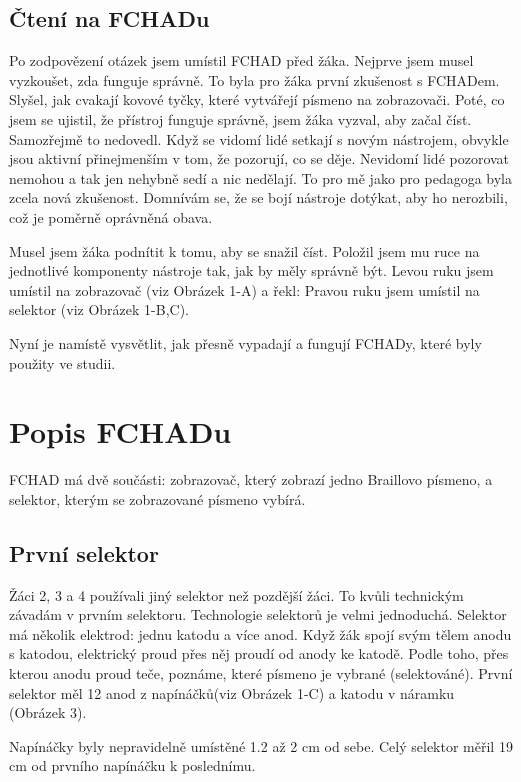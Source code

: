 \subsection{Čtení na FCHADu}

Po zodpovězení otázek jsem umístil FCHAD před žáka.  Nejprve jsem musel vyzkoušet, zda funguje správně. To byla pro žáka první zkušenost s FCHADem.  Slyšel, jak cvakají kovové tyčky, které vytvářejí písmeno na zobrazovači.  Poté, co jsem se ujistil, že přístroj funguje správně, jsem žáka vyzval, aby začal číst.  Samozřejmě to nedovedl.  Když se vidomí lidé setkají s novým nástrojem, obvykle jsou aktivní přinejmenším v tom, že pozorují, co se děje. Nevidomí lidé pozorovat nemohou a tak jen nehybně sedí a nic nedělají. To pro mě jako pro pedagoga byla zcela nová zkušenost. Domnívám se, že se bojí nástroje dotýkat, aby ho nerozbili, což je poměrně oprávněná obava.

Musel jsem žáka podnítit k tomu, aby se snažil číst. Položil jsem mu ruce na jednotlivé komponenty nástroje tak, jak by měly správně být. Levou ruku jsem umístil na zobrazovač (viz Obrázek 1-A) a řekl:   Pravou ruku jsem umístil na selektor (viz Obrázek 1-B,C).

Nyní je namístě vysvětlit, jak přesně vypadají a fungují FCHADy, které byly použity ve studii.

\section{Popis FCHADu}

FCHAD má dvě součásti: zobrazovač, který zobrazí jedno Braillovo písmeno, a selektor, kterým se zobrazované písmeno vybírá.

\subsection{První selektor}

Žáci 2, 3 a 4 používali jiný selektor než pozdější žáci.  To kvůli technickým závadám v prvním selektoru.   Technologie selektorů je velmi jednoduchá.  Selektor má několik elektrod: jednu katodu a více anod. Když žák spojí svým tělem anodu s katodou, elektrický proud přes něj proudí od anody ke katodě. Podle toho, přes kterou anodu  proud teče, poznáme, které písmeno je vybrané   (selektováné).   První selektor měl 12 anod z napínáčků(viz Obrázek 1-C) a katodu v náramku (Obrázek 3).

Napínáčky byly nepravidelně umístěné 1.2 až 2 cm od sebe.  Celý selektor měřil 19 cm od prvního napínáčku k poslednímu.

